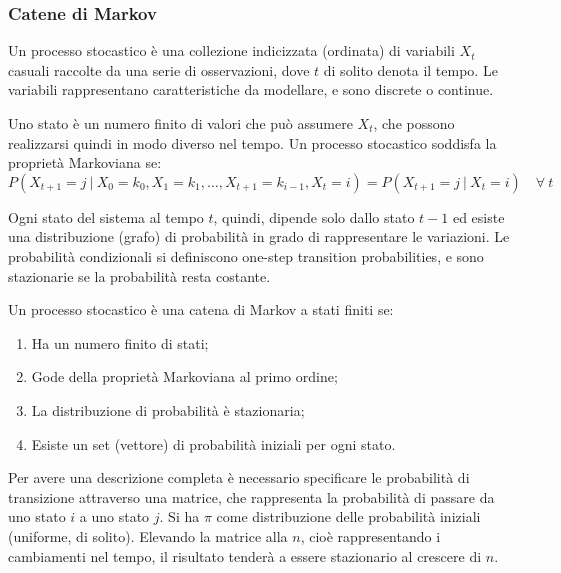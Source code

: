 \subsubsection{Catene di Markov}
Un processo stocastico è una collezione indicizzata (ordinata) di variabili $X_t$ casuali raccolte da una serie di osservazioni, dove $t$ di solito denota il tempo. Le variabili rappresentano caratteristiche da modellare, e sono discrete o continue.

Uno stato è un numero finito di valori che può assumere $X_t$, che possono realizzarsi quindi in modo diverso nel tempo. Un processo stocastico soddisfa la proprietà Markoviana se:
$$P(X_{t+1} = j\ |\ X_0 = k_0, X_1 = k_1, \dots, X_{t+1} = k_{i-1}, X_t = i) = P(X_{t+1} = j\ |\ X_t = i) \quad \forall\ t$$

Ogni stato del sistema al tempo $t$, quindi, dipende solo dallo stato $t - 1$ ed esiste una distribuzione (grafo) di probabilità in grado di rappresentare le variazioni. Le probabilità condizionali si definiscono one-step transition probabilities, e sono stazionarie se la probabilità resta costante. 

Un processo stocastico è una catena di Markov a stati finiti se:
\begin{enumerate}
	\item Ha un numero finito di stati;
	\item Gode della proprietà Markoviana al primo ordine;
	\item La distribuzione di probabilità è stazionaria;
	\item Esiste un set (vettore) di probabilità iniziali per ogni stato.
\end{enumerate}

Per avere una descrizione completa è necessario specificare le probabilità di transizione attraverso una matrice, che rappresenta la probabilità di passare da uno stato $i$ a uno stato $j$. Si ha $\pi$ come distribuzione delle probabilità iniziali (uniforme, di solito). Elevando la matrice alla $n$, cioè rappresentando i cambiamenti nel tempo, il risultato tenderà a essere stazionario al crescere di $n$.

